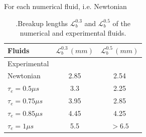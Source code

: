 \documentclass[twocolumn,10pt]{asme2ej}
\begin{document}
For each numerical fluid, i.e. Newtonian
\begin{table}
    \begin{center}
        \begin{tabular}{l|cc}
            Fluids & $\mathcal{L}^{0.3}_b\,(mm)$ &$\mathcal{L}^{0.5}_b\,(mm)$\\
            \hline
            Experimental  &  & \\
            Newtonian & 2.85 & 2.54\\ 
            $\tau_e = 0.5\mu s$ & 3.3 & 2.25\\ 
            $\tau_e = 0.75\mu s$ & 3.95 & 2.85\\ 
            $\tau_e = 0.85\mu s$ & 4.45 & 4.25\\ 
            $\tau_e = 1\mu s$ & 5.5 & $> 6.5$\\ 
            \hline
        \end{tabular}
    \end{center}
    
    \caption{\label{tab:lbInk}.Breakup lengths $\mathcal{L}^{0.3}_b$ and $\mathcal{L}^{0.5}_b$ of the numerical and experimental fluids. }
\end{table}



\end{document}
